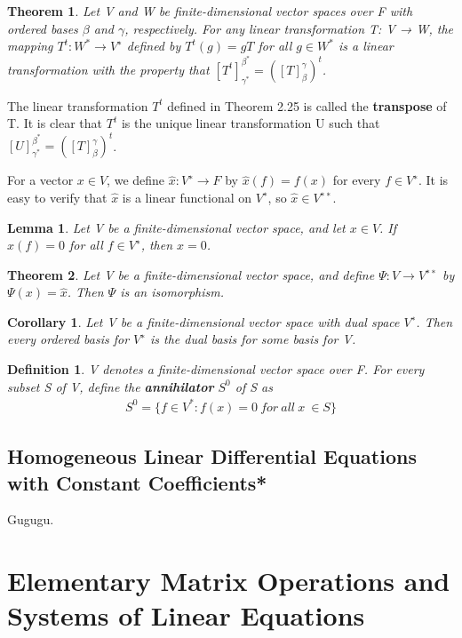 \documentclass{article}
\newcommand{\bd}[1]{\textbf{#1}}
\theoremstyle{plain}
\newtheorem{theorem}{Theorem}[section]
\newtheorem*{lemma1}{Lemma}
\newtheorem*{corollary}{Corollary}
\newtheorem*{definition1}{Definition}
\theoremstyle{plain} %
\begin{document}
\begin{theorem}
Let V and W be finite-dimensional vector spaces over F with ordered bases $\beta$ and $\gamma$, respectively. For any linear transformation T: V → W, the mapping $T^t : W^* \to V^∗$ defined by $T^t(g) = gT$ for all $g\in W^*$ is a linear transformation with the property that $[T^t]_{\gamma^*}^{\beta^*}={([T]_\beta^\gamma)}^t$.
\end{theorem}

The linear transformation $T^t$ defined in Theorem 2.25 is called the \bd{transpose} of T. It is clear that $T^t$ is the unique linear transformation U such that $[U]_{\gamma^*}^{\beta^*}=([T]_\beta^\gamma)^t$.

For a vector $x \in V$, we define $\hat{x}: V^∗ \to F$ by $\hat{x}(f) = f(x)$ for every $f \in V^∗$. It is easy to verify that $\hat{x}$ is a linear functional on $V^∗$, so $\hat{x} \in V^{∗∗}$.

\begin{lemma1}
Let V be a finite-dimensional vector space, and let $x \in V$. If $\hat{x}(f)=0$ for all $f \in V^∗$, then $x = 0$.
\end{lemma1}

\begin{theorem}
Let V be a finite-dimensional vector space, and define $\Psi: V \to V^{∗∗}$ by $\Psi(x) = \hat{x}$. Then $\Psi$ is an isomorphism.
\end{theorem}

\begin{corollary}
Let V be a finite-dimensional vector space with dual space $V^∗$. Then every ordered basis for $V^∗$ is the dual basis for some basis for V.
\end{corollary}

\begin{definition1}
V denotes a finite-dimensional vector space over F. For every subset S of V, define the \bd{annihilator} $S^0$ of S as
\begin{align*}
S^0 = \{ f \in V^* : f(x) = 0~for~all~x~\in S\}
\end{align*}
\end{definition1}

\subsection{Homogeneous Linear Differential Equations with Constant Coefficients*}

Gugugu.

\section {Elementary Matrix Operations and Systems of Linear Equations}
\end{document}
